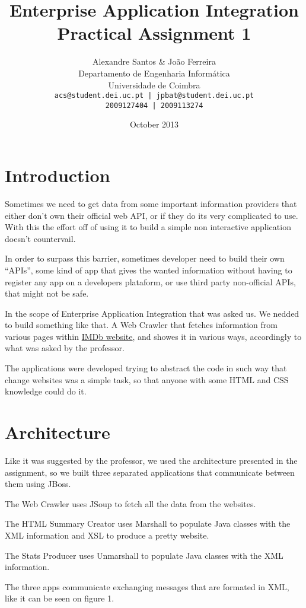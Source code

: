 \documentclass[a4paper]{article}
\title{Enterprise Application Integration \\ Practical Assignment 1}
\author{Alexandre Santos \& João Ferreira\\
		Departamento de Engenharia Informática\\
		Universidade de Coimbra\\
		\texttt{acs@student.dei.uc.pt | jpbat@student.dei.uc.pt}\\
		\texttt{2009127404 | 2009113274}}
\date{October 2013}
\begin{document}
\maketitle
\clearpage

\tableofcontents

\setlength{\parindent}{1cm}
\setlength{\parskip}{0.3cm}

\clearpage
\section{Introduction}
\indent \indent Sometimes we need to get data from some important information providers that either don't own their official web API, or if they do its very complicated to use. With this the effort off of using it to build a simple non interactive application doesn't countervail.

In order to surpass this barrier, sometimes developer need to build their own ``APIs'', some kind of app that gives the wanted information without having to register any app on a developers plataform, or use third party non-official APIs, that might not be safe.

In the scope of Enterprise Application Integration that was asked us. We nedded to build something like that. A Web Crawler that fetches information from various pages within \href{http://www.imdb.com}{IMDb website}, and showes it in various ways, accordingly to what was asked by the professor.

The applications were developed trying to abstract the code in such way that change websites was a simple task, so that anyone with some HTML and CSS knowledge could do it.

\clearpage
\section{Architecture}
\indent \indent Like it was suggested by the professor, we used the architecture presented in the assignment, so we built three separated applications that communicate between them using JBoss.

The Web Crawler uses JSoup to fetch all the data from the websites.

The HTML Summary Creator uses Marshall to populate Java classes with the XML information and XSL to produce a pretty website.

The Stats Producer uses Unmarshall to populate Java classes with the XML information.

The three apps communicate exchanging messages that are formated in XML, like it can be seen on figure 1.
\end{document}
